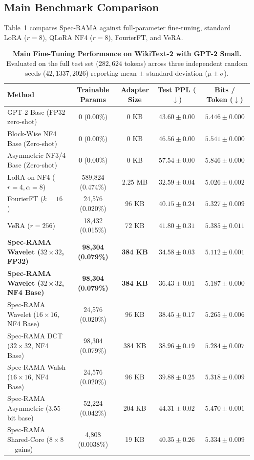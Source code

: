 \documentclass{article}
\begin{document}
\subsection{Main Benchmark Comparison}

Table~\ref{tab:main_results} compares Spec-RAMA against full-parameter fine-tuning, standard LoRA ($r=8$), QLoRA NF4 ($r=8$), FourierFT, and VeRA.

\begin{table}[t]
\centering
\caption{\textbf{Main Fine-Tuning Performance on WikiText-2 with GPT-2 Small.} Evaluated on the full test set ($282,624$ tokens) across three independent random seeds ($42, 1337, 2026$) reporting mean $\pm$ standard deviation ($\mu \pm \sigma$).}
\label{tab:main_results}
\small
\begin{tabular}{lcccc}
\toprule
\textbf{Method} & \textbf{Trainable Params} & \textbf{Adapter Size} & \textbf{Test PPL} ($\downarrow$) & \textbf{Bits / Token} ($\downarrow$) \\
\midrule
GPT-2 Base (FP32 zero-shot) & 0 (0.00\%) & 0 KB & $43.60 \pm 0.00$ & $5.446 \pm 0.000$ \\
Block-Wise NF4 Base (Zero-shot) & 0 (0.00\%) & 0 KB & $46.56 \pm 0.00$ & $5.541 \pm 0.000$ \\
Asymmetric NF3/4 Base (Zero-shot) & 0 (0.00\%) & 0 KB & $57.54 \pm 0.00$ & $5.846 \pm 0.000$ \\
\midrule
LoRA on NF4 ($r=4, \alpha=8$)~\cite{hu2022lora} & 589,824 (0.474\%) & 2.25 MB & $32.59 \pm 0.04$ & $5.026 \pm 0.002$ \\
FourierFT ($k=16$)~\cite{gao2024fourierft} & 24,576 (0.020\%) & 96 KB & $40.15 \pm 0.24$ & $5.327 \pm 0.009$ \\
VeRA ($r=256$)~\cite{kopiczko2024vera} & 18,432 (0.015\%) & 72 KB & $41.80 \pm 0.31$ & $5.385 \pm 0.011$ \\
\midrule
\textbf{Spec-RAMA Wavelet ($32\times 32$, FP32)} & \textbf{98,304 (0.079\%)} & \textbf{384 KB} & $\mathbf{34.58 \pm 0.03}$ & $\mathbf{5.112 \pm 0.001}$ \\
\textbf{Spec-RAMA Wavelet ($32\times 32$, NF4 Base)} & \textbf{98,304 (0.079\%)} & \textbf{384 KB} & $\mathbf{36.43 \pm 0.01}$ & $\mathbf{5.187 \pm 0.000}$ \\
Spec-RAMA Wavelet ($16\times 16$, NF4 Base) & 24,576 (0.020\%) & 96 KB & $38.45 \pm 0.17$ & $5.265 \pm 0.006$ \\
Spec-RAMA DCT ($32\times 32$, NF4 Base) & 98,304 (0.079\%) & 384 KB & $38.96 \pm 0.19$ & $5.284 \pm 0.007$ \\
Spec-RAMA Walsh ($16\times 16$, NF4 Base) & 24,576 (0.020\%) & 96 KB & $39.88 \pm 0.25$ & $5.318 \pm 0.009$ \\
\midrule
Spec-RAMA Asymmetric ($3.55$-bit base) & 52,224 (0.042\%) & 204 KB & $44.31 \pm 0.02$ & $5.470 \pm 0.001$ \\
Spec-RAMA Shared-Core ($8\times 8$ + gains) & 4,808 (0.0038\%) & 19 KB & $40.35 \pm 0.26$ & $5.334 \pm 0.009$ \\
\bottomrule
\end{tabular}
\end{table}
\end{document}
